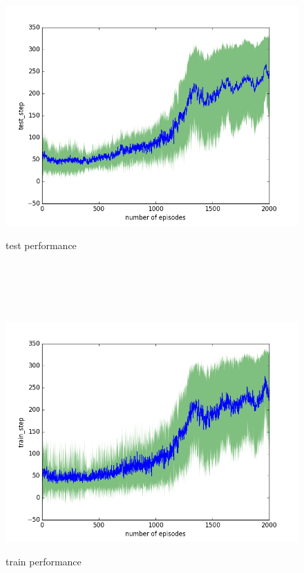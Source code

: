 \documentclass{report}
\begin{document}
\begin{figure}[H]
\begin{minipage}[c]{.49\linewidth}
	\centering
	\includegraphics[width = \linewidth]{plots/a4/test_step.png}
	\caption{test performance}
    \end{minipage}
    \hfill%
\begin{minipage}[c]{.49\linewidth}
    \centering 
    \includegraphics[width = \linewidth]{plots/a4/train_step.png}
	\caption{train performance}
\end{minipage}

\end{figure}
\end{document}
